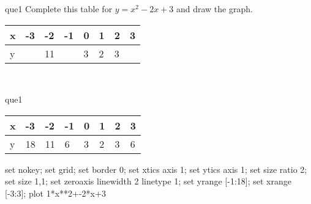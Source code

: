 \documentclass[13.5pt, varwidth=true]{beamer}
\begin{document}
\begin{frame}[shrink=19,fragile]
	\begin{beamercolorbox}[rounded=true, left, shadow=true,wd=14.8cm]{que1}
		 Complete this table for $y = x^{2} - 2x + 3$ and draw the graph. \\[0.3cm] \renewcommand{\arraystretch}{1.2}\begin{tabular}{|C|C|C|C|C|C|C|C|} \hline x & -3 & -2 & -1 & 0 & 1 & 2 & 3 \\ \hline y &  & 11 &  & 3 & 2 & 3 & \\ \hline \end{tabular}\\[0.3cm]
	\end{beamercolorbox}
\end{frame}
\begin{frame}[shrink=19,fragile]
	\begin{beamercolorbox}[rounded=true, left, shadow=true,wd=14.8cm]{que1}
		\renewcommand{\arraystretch}{1.2}\begin{tabular}{|C|C|C|C|C|C|C|C|} \hline x & -3 & -2 & -1 & 0 & 1 & 2 & 3 \\ \hline y & 18 & 11 & 6 & 3 & 2 & 3 & 6\\ \hline \end{tabular}\begin{gnuplot}[terminal=pdf] set nokey; set grid; set border 0; set xtics axis 1; set ytics axis 1; set size ratio 2; set size 1,1; set zeroaxis linewidth 2 linetype 1; set yrange [-1:18]; set xrange [-3:3]; plot 1*x**2+-2*x+3 \end{gnuplot}
	\end{beamercolorbox}
\end{frame}
\end{document}
